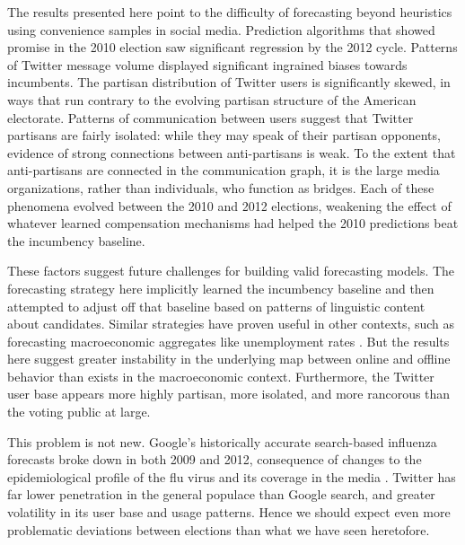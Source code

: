 \documentclass{article}
\begin{document}
The results presented here point to the difficulty of forecasting
beyond heuristics using convenience samples in social
media. Prediction algorithms that showed promise in the 2010 election
saw significant regression by the 2012 cycle. Patterns of Twitter
message volume displayed significant ingrained biases towards
incumbents. The partisan distribution of Twitter users is
significantly skewed, in ways that run contrary to the evolving
partisan structure of the American electorate. Patterns of
communication between users suggest that Twitter partisans are fairly
isolated: while they may speak of their partisan opponents, evidence
of strong connections between anti-partisans is weak. To the extent
that anti-partisans are connected in the communication graph, it is
the large media organizations, rather than individuals, who function
as bridges. Each of these phenomena evolved between the 2010
and 2012 elections, weakening the effect of whatever learned
compensation mechanisms had helped the 2010 predictions beat the
incumbency baseline. 

These factors suggest future challenges for building valid forecasting
models. The forecasting strategy here implicitly learned the
incumbency baseline and then attempted to adjust off that baseline
based on patterns of linguistic content about candidates. Similar
strategies have proven useful in other contexts, such as forecasting
macroeconomic aggregates like unemployment rates
\cite{choi2012predicting}. But the results here suggest greater
instability in the underlying map between online and offline behavior
than exists in the macroeconomic context. Furthermore, the Twitter
user base appears more highly partisan, more isolated, and more
rancorous than the voting public at large. 

This problem is not new. Google's historically accurate search-based
influenza forecasts \citep{ginsberg2008detecting} broke down in both
2009 and 2012, consequence of changes to the epidemiological profile
of the flu virus and its coverage in the media
\citep{butler2013google,41763}. Twitter has far lower penetration in
the general populace than Google search, and greater volatility in its
user base and usage patterns. Hence we should expect even more
problematic deviations between elections than what we have seen
heretofore.

\end{document}
